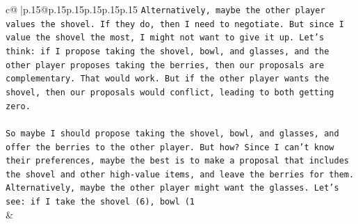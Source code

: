 \documentclass{article}
\begin{document}
{\begin{supertabular}{c@{$\;$}|p{.15\linewidth}@{}p{.15\linewidth}p{.15\linewidth}p{.15\linewidth}p{.15\linewidth}p{.15\linewidth}}
{{{\texttt{Alternatively, maybe the other player values the shovel. If they do, then I need to negotiate. But since I value the shovel the most, I might not want to give it up. Let's think: if I propose taking the shovel, bowl, and glasses, and the other player proposes taking the berries, then our proposals are complementary. That would work. But if the other player wants the shovel, then our proposals would conflict, leading to both getting zero.} \\
\\ 
\texttt{So maybe I should propose taking the shovel, bowl, and glasses, and offer the berries to the other player. But how? Since I can't know their preferences, maybe the best is to make a proposal that includes the shovel and other high{-}value items, and leave the berries for them. Alternatively, maybe the other player might want the glasses. Let's see: if I take the shovel (6), bowl (1} \\
            }
        }
    }
    & \\ \\


\end{supertabular}}
\end{document}

